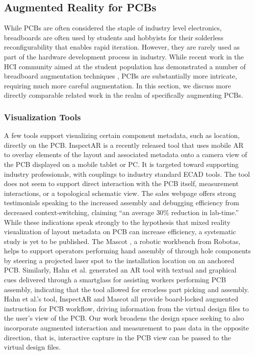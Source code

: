 \documentclass [11pt, proquest] {uwthesis}[2020/02/24]
\begin{document}
\subsection{Augmented Reality for PCBs}

While PCBs are often considered the staple of industry level electronics, breadboards are often used by students and hobbyists for their solderless reconfigurability that enables rapid iteration. However, they are rarely used as part of the hardware development process in industry.
While recent work in the HCI community aimed at the student population has demonstrated a number of breadboard augmentation techniques \cite{Ochiai2014VisibleElectricity, Drew2016TheToastboard, Wu2017CurrentViz, Kim2019VirtualComponent}, PCBs are substantially more intricate, requiring much more careful augmentation.
In this section, we discuss more directly comparable related work in the realm of specifically augmenting PCBs.


\subsubsection{Visualization Tools}
A few tools support visualizing certain component metadata, such as location, directly on the PCB.
InspectAR \cite{InspectARTools} is a recently released tool that uses mobile AR to overlay elements of the layout and associated metadata onto a camera view of the PCB displayed on a mobile tablet or PC.
It is targeted toward supporting industry professionals, with couplings to industry standard ECAD tools.
The tool does not seem to support direct interaction with the PCB itself, measurement interactions, or a topological schematic view.
The sales webpage offers strong testimonials speaking to the increased assembly and debugging efficiency from decreased context-switching, claiming “an average 30\% reduction in lab-time.”
While these indications speak strongly to the hypothesis that mixed reality visualization of layout metadata on PCB can increase efficiency, a systematic study is yet to be published.
The Mascot \cite{MascotRobotas}, a robotic workbench from Robotas, helps to support operators performing hand assembly of through hole components
by steering a projected laser spot to the installation location on an anchored PCB.
Similarly, Hahn et al. \cite{Hahn2015AugmentedProcess} generated an AR tool with textual and graphical cues delivered through a smartglass for assisting workers performing PCB assembly, indicating that the tool allowed for errorless part picking and assembly.
Hahn et al.’s tool, InspectAR and Mascot all provide board-locked augmented instruction for PCB workflow, driving information from the virtual design files to the user’s view of the PCB. Our work broadens the design space seeking to also incorporate augmented interaction and measurement to pass data in the opposite direction, that is, interactive capture in the PCB view can be passed to the virtual design files.
\end{document}
